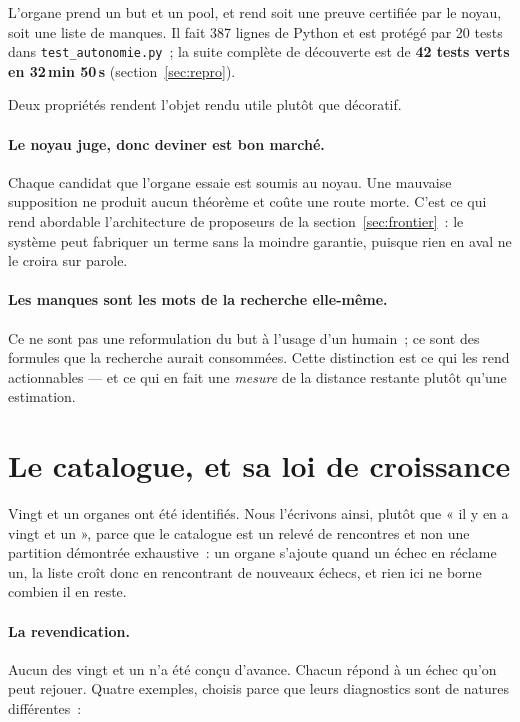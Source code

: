 \documentclass[11pt]{article}
\theoremstyle{remark}\newtheorem{remarque}{Remarque}
\begin{document}
L'organe prend un but et un pool, et rend soit une preuve certifiée par le noyau, soit
une liste de manques. Il fait 387 lignes de Python et est protégé par 20 tests dans
\texttt{test\_autonomie.py}~; la suite complète de découverte est de \textbf{42 tests
verts en 32\,min 50\,s} (section~\ref{sec:repro}).

Deux propriétés rendent l'objet rendu utile plutôt que décoratif.

\paragraph{Le noyau juge, donc deviner est bon marché.} Chaque candidat que l'organe
essaie est soumis au noyau. Une mauvaise supposition ne produit aucun théorème et coûte
une route morte. C'est ce qui rend abordable l'architecture de proposeurs de la
section~\ref{sec:frontier}~: le système peut fabriquer un terme sans la moindre
garantie, puisque rien en aval ne le croira sur parole.

\paragraph{Les manques sont les mots de la recherche elle-même.} Ce ne sont pas une
reformulation du but à l'usage d'un humain~; ce sont des formules que la recherche aurait
consommées. Cette distinction est ce qui les rend actionnables --- et ce qui en fait une
\emph{mesure} de la distance restante plutôt qu'une estimation.

\section{Le catalogue, et sa loi de croissance}
\label{sec:catalogue}

Vingt et un organes ont été identifiés. Nous l'écrivons ainsi, plutôt que « il y en a
vingt et un », parce que le catalogue est un relevé de rencontres et non une partition
démontrée exhaustive~: un organe s'ajoute quand un échec en réclame un, la liste croît
donc en rencontrant de nouveaux échecs, et rien ici ne borne combien il en reste.

\paragraph{La revendication.} Aucun des vingt et un n'a été conçu d'avance. Chacun répond
à un échec qu'on peut rejouer. Quatre exemples, choisis parce que leurs diagnostics sont
de natures différentes~:
\end{document}
